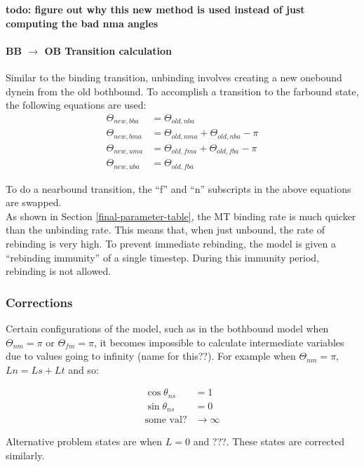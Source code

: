 \documentclass[10pt]{article} %
\begin{document}
\textbf{todo: figure out why this new method is used instead of just computing the bad nma angles}

\paragraph{BB $\rightarrow$ OB Transition calculation}
Similar to the binding transition, unbinding involves creating a new onebound dynein from the old bothbound. To accomplish a transition to the farbound state, the following equations are used:\\

\begin{align}
  \Theta_{new,bba} &= \Theta_{old,nba}\\
  \Theta_{new,bma} &= \Theta_{old,nma} + \Theta_{old,nba} - \pi\\
  \Theta_{new,uma} &= \Theta_{old,fma} + \Theta_{old,fba} - \pi\\
  \Theta_{new,uba} &= \Theta_{old,fba}
\end{align}

To do a nearbound transition, the ``f'' and ``n'' subscripts in the above equations are swapped.\\

As shown in Section \ref{final-parameter-table}, the MT binding rate is much quicker than the unbinding rate. This means that, when just unbound, the rate of rebinding is very high. To prevent immediate rebinding, the model is given a ``rebinding immunity'' of a single timestep. During this immunity period, rebinding is not allowed.\\

\subsubsection{Corrections}
\label{corrections-section}
Certain configurations of the model, such as in the bothbound model when $\Theta_{nm} = \pi$ or $\Theta_{fm} = \pi$, it becomes impossible to calculate intermediate variables due to values going to infinity (name for this??). For example when $\Theta_{nm} = \pi$, $Ln = Ls + Lt$ and so:

\begin{align}
  \cos\theta_{ns} &= 1 \\
  \sin\theta_{ns} &= 0 \\
  \mbox{some val?} &\rightarrow \infty
\end{align}

Alternative problem states are when $L = 0$ and ???. These states are corrected similarly.\\
\end{document}
